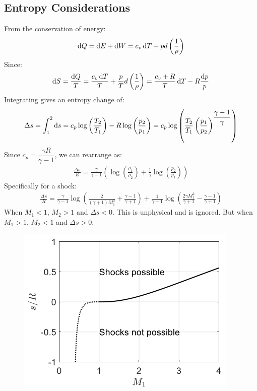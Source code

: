 \documentclass[class=report, crop=false, 12pt,a4paper]{standalone}
\begin{document}
\subsection{Entropy Considerations}
From the conservation of energy: 
\begin{gather}
    \dif Q = \dif E + \dif W = c_v\dif T + pd\left(\frac{1}{\rho}\right)
\end{gather}
Since: 
\begin{gather}
    \dif S = \frac{\dif Q}{T}= \frac{c_v \dif T}{T} + \frac{p}{T}d\left(\frac{1}{\rho}\right) = \frac{c_v+R}{T}\dif T - R\frac{\dif p}{p}
\end{gather} 
Integrating gives an entropy change of: 
\begin{gather}
    \Delta s = \int_{1}^{2}\dif s = c_p \log\left(\frac{T_2}{T_1}\right) - R\log\left(\frac{p_2}{p_1}\right) = c_p\log \left( \frac{T_2}{T_1} \left(\frac{p_1}{p_2}\right)^{\dfrac{\gamma-1}{\gamma}} \right)
\end{gather}
Since $c_p = \dfrac{\gamma R}{\gamma-1}$, we can rearrange as: 
\begin{gather}
    \frac{\Delta s}{R} = \frac{\gamma}{\gamma-1} \left( \log\left(\frac{\rho_1}{\rho_2}\right) + \frac{1}{\gamma}\log\left(\frac{p_2}{p_1}\right) \right)
\end{gather}
Specifically for a shock: 
\begin{gather}
    \frac{\Delta s}{R} = \frac{\gamma}{\gamma-1}\log \left( \frac{2}{(\gamma+1)M_1^2} + \frac{\gamma-1}{\gamma+1} \right) + \frac{1}{\gamma-1}\log \left( \frac{2\gamma M_1^2}{\gamma+1} - \frac{\gamma-1}{\gamma+1} \right)
\end{gather}
When $M_1<1$, $M_2>1$ and $\Delta s<0$. This is unphysical and is ignored. But when $M_1>1$, $M_2<1$ and $\Delta s>0$. 
\begin{figure}[H]
    \centering
    \includegraphics[width = 0.55 \textwidth]{../img/diagram7.PNG} 
    \caption{}
\end{figure}
\end{document}
